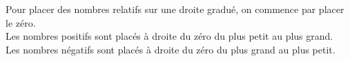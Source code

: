 
{Pour placer des nombres relatifs sur une droite gradué, on commence par placer le zéro.
\\
Les nombres positifs sont placés à droite du zéro du plus petit au plus grand.
\\
Les nombres négatifs sont placés à droite du zéro du plus grand au plus petit.}


